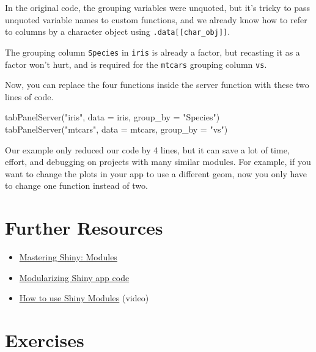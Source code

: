 \documentclass[
  oneside]{book}
\newenvironment{Shaded}{\begin{snugshade}}{\end{snugshade}}
\newcommand{\AttributeTok}[1]{\textcolor[rgb]{0.77,0.63,0.00}{#1}}
\newcommand{\FunctionTok}[1]{\textcolor[rgb]{0.00,0.00,0.00}{#1}}
\newcommand{\NormalTok}[1]{#1}
\newcommand{\StringTok}[1]{\textcolor[rgb]{0.31,0.60,0.02}{#1}}
\providecommand{\tightlist}{%
  \setlength{\itemsep}{0pt}\setlength{\parskip}{0pt}}
\begin{document}
\begin{warning}
In the original code, the grouping variables were unquoted, but it's tricky to pass unquoted variable names to custom functions, and we already know how to refer to columns by a character object using \texttt{.data{[}{[}char\_obj{]}{]}}.

The grouping column \texttt{Species} in \texttt{iris} is already a factor, but recasting it as a factor won't hurt, and is required for the \texttt{mtcars} grouping column \texttt{vs}.

\end{warning}

Now, you can replace the four functions inside the server function with these two lines of code.

\begin{Shaded}
\begin{Highlighting}[]
\FunctionTok{tabPanelServer}\NormalTok{(}\StringTok{"iris"}\NormalTok{, }\AttributeTok{data =}\NormalTok{ iris, }\AttributeTok{group\_by =} \StringTok{"Species"}\NormalTok{)}
\FunctionTok{tabPanelServer}\NormalTok{(}\StringTok{"mtcars"}\NormalTok{, }\AttributeTok{data =}\NormalTok{ mtcars, }\AttributeTok{group\_by =} \StringTok{"vs"}\NormalTok{)}
\end{Highlighting}
\end{Shaded}

Our example only reduced our code by 4 lines, but it can save a lot of time, effort, and debugging on projects with many similar modules. For example, if you want to change the plots in your app to use a different geom, now you only have to change one function instead of two.

\hypertarget{resources-modules}{%
\section{Further Resources}\label{resources-modules}}

\begin{itemize}
\tightlist
\item
  \href{https://mastering-shiny.org/scaling-modules.html}{Mastering Shiny: Modules}
\item
  \href{https://shiny.rstudio.com/articles/modules.html}{Modularizing Shiny app code}
\item
  \href{https://www.rstudio.com/resources/shiny-dev-con/modules/}{How to use Shiny Modules} (video)
\end{itemize}

\hypertarget{exercises-modules}{%
\section{Exercises}\label{exercises-modules}}
\end{document}

